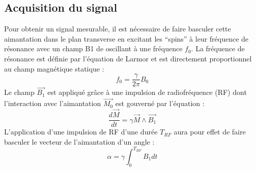 \subsection{Acquisition du signal}

Pour obtenir un signal mesurable, il est nécessaire de faire basculer cette aimantation dans le plan transverse en excitant les “spins” à leur fréquence de résonance avec un champ B1 de oscillant à une fréquence $f_0$. La fréquence de résonance est définie par l’équation de Larmor et est directement proportionnel au champ magnétique statique  :
	\begin{equation}
f_0=\frac{\gamma}{2\pi} B_0
\end{equation}
Le champ $\overrightarrow{B_1}$ est appliqué grâce à une impulsion de radiofréquence (RF) dont l'interaction avec l'aimantation $\overrightarrow{M_0}$ est gouverné par l'équation :
	\begin{equation}
	\frac{d\overrightarrow{M}}{dt}=\gamma \overrightarrow{M}\wedge\overrightarrow{B_1}
	\end{equation}
L'application d'une impulsion de RF d'une durée $T_{RF}$ aura pour effet de faire basculer le vecteur de l'aimantation d'un angle :
	\begin{equation}
\alpha=\gamma \int_0^{T_{RF}}B_1dt
\end{equation}

